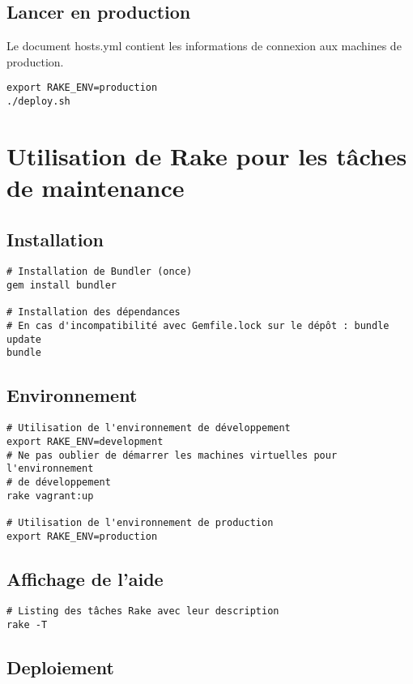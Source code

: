 \documentclass[a4paper,oneside,12pt]{article}
\begin{document}
\subsection{Lancer en production}

Le document hosts.yml contient les informations de connexion aux machines de production. 

\begin{verbatim}
export RAKE_ENV=production
./deploy.sh
\end{verbatim}

\pagebreak
\section{Utilisation de Rake pour les tâches de maintenance}

\subsection{Installation}

\begin{verbatim}
# Installation de Bundler (once)
gem install bundler

# Installation des dépendances
# En cas d'incompatibilité avec Gemfile.lock sur le dépôt : bundle update
bundle
\end{verbatim}

\subsection{Environnement}

\begin{verbatim}
# Utilisation de l'environnement de développement
export RAKE_ENV=development
# Ne pas oublier de démarrer les machines virtuelles pour l'environnement 
# de développement
rake vagrant:up

# Utilisation de l'environnement de production
export RAKE_ENV=production
\end{verbatim}

\subsection{Affichage de l'aide}

\begin{verbatim}
# Listing des tâches Rake avec leur description
rake -T
\end{verbatim}

\subsection{Deploiement}
\end{document}
